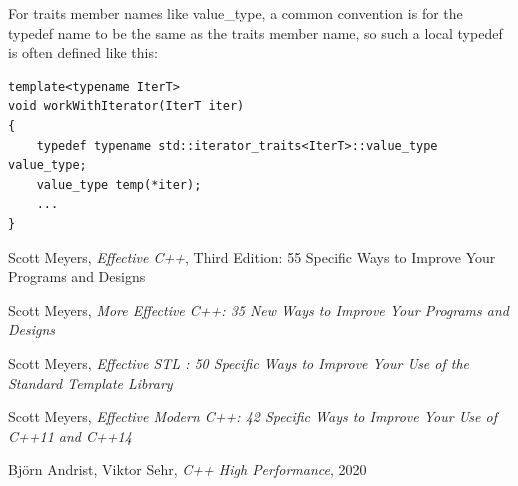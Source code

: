 \documentclass[a4paper,12pt,notitlepage]{article}
\begin{document}
For traits member names like value\_type, a common convention is for the typedef name to be the same as the traits member name, so such a local typedef is often defined like this:

\begin{verbatim}
template<typename IterT>
void workWithIterator(IterT iter)
{
    typedef typename std::iterator_traits<IterT>::value_type value_type;
    value_type temp(*iter);
    ...
}
\end{verbatim}


\begin{thebibliography}{9}

    Scott Meyers, \textit{Effective C++}, Third Edition: 55 Specific Ways to Improve Your Programs and Designs

    Scott Meyers, \textit{More Effective C++: 35 New Ways to Improve Your Programs and Designs}

    Scott Meyers, \textit{Effective STL : 50 Specific Ways to Improve Your Use of the Standard Template Library}

    Scott Meyers, \textit{Effective Modern C++: 42 Specific Ways to Improve Your Use of C++11 and C++14}

    Björn Andrist, Viktor Sehr, \textit{C++ High Performance}, 2020
    
\end{thebibliography}

\end{document}
